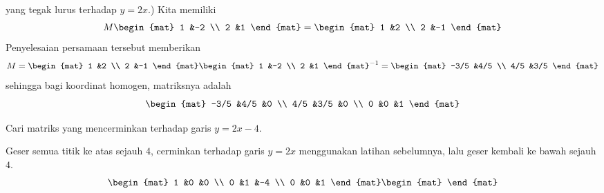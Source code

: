 \begin{exercises}
\begin{answer}
      yang tegak lurus terhadap $y=2x$.)
      Kita memiliki
      \begin{equation*}
        M
        \begin{mat}
          1  &-2  \\
          2  &1
        \end{mat}
        =
        \begin{mat}
          1  &2  \\
          2  &-1
        \end{mat}
      \end{equation*}
      Penyelesaian persamaan tersebut memberikan
      \begin{equation*}
        M =
            \begin{mat}
              1  &2  \\
              2  &-1
            \end{mat}
            \begin{mat}
              1  &-2  \\
              2  &1     
            \end{mat}^{-1}
          =
            \begin{mat}
              -3/5  &4/5 \\
              4/5   &3/5
            \end{mat}
      \end{equation*}
      sehingga bagi koordinat homogen, matriksnya adalah
      \begin{equation*}
      \begin{mat}
        -3/5  &4/5  &0  \\
         4/5  &3/5  &0  \\
           0  &0    &1
      \end{mat}
      \end{equation*}
    \end{answer}
  \item Cari matriks yang mencerminkan terhadap garis $y=2x-4$.
    \begin{answer}
      Geser semua titik ke atas sejauh $4$, cerminkan terhadap garis $y=2x$
      menggunakan latihan sebelumnya, lalu geser kembali ke bawah sejauh $4$.
      \begin{equation*}
      \begin{mat}
        1  &0  &0  \\
        0  &1  &-4 \\
        0  &0  &1
      \end{mat}
      \begin{mat}

\end{mat}
\end{equation*}
\end{answer}
\end{exercises}
